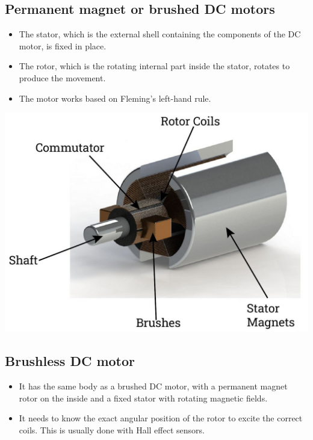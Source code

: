 \documentclass[11pt]{article}
\begin{document}
\subsection{Permanent magnet or brushed DC motors}
\label{sec:org8651b22}
\begin{itemize}
\item The stator, which is the external shell containing the components of the DC motor, is fixed in place.
\item The rotor, which is the rotating internal part inside the stator, rotates to produce the movement.
\item The motor works based on Fleming's left-hand rule.
\end{itemize}

\begin{center}
\includegraphics[width=.9\linewidth]{./images/brushed-dc-motor.png}
\end{center}

 \newpage

\subsection{Brushless DC motor}
\label{sec:orgffd2a49}
\begin{itemize}
\item It has the same body as a brushed DC motor, with a permanent magnet rotor on the inside and a fixed stator with rotating magnetic fields.
\item It needs to know the exact angular position of the rotor to excite the correct coils. This is usually done with Hall effect sensors.
\end{itemize}
\end{document}
